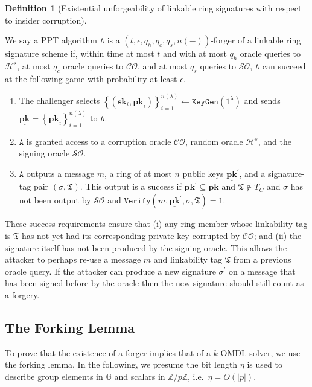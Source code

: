 \documentclass{article}
\theoremstyle{plain}
\theoremstyle{definition}
\newtheorem{defn}{Definition}[section]
\begin{document}
\begin{defn}[Existential unforgeability of linkable ring signatures with respect to insider corruption]\label{def:unf}

We say a PPT algorithm $\texttt{A}$  is a $(t, \epsilon, q_h, q_c, q_s,  n(-))$-forger of a linkable ring signature scheme if, within time at most $t$ and with at most $q_h$ oracle queries to $\mathcal{H}^s$, at most $q_c$ oracle queries to $\mathcal{CO}$, and at most $q_s$ queries to $\mathcal{SO}$, $\texttt{A}$ can succeed at the following game with probability at least $\epsilon$.
\begin{enumerate}
\item The challenger selects $\left\{(\textbf{sk}_i, \textbf{pk}_i)\right\}_{i=1}^{n(\lambda)} \leftarrow \texttt{KeyGen}(1^\lambda)$ and sends $\underline{\textbf{pk}} = \left\{\textbf{pk}_i\right\}_{i=1}^{n(\lambda)}$ to $\texttt{A}$. 

\item $\texttt{A}$ is granted access to a corruption oracle $\mathcal{CO}$, random oracle $\mathcal{H}^s$, and the signing oracle $\mathcal{SO}$.

\item $\texttt{A}$ outputs a message $m$, a ring of at most $n$ public keys $\underline{\textbf{pk}}^\prime$, and a signature-tag pair $(\sigma, \mathfrak{T})$. This output is a success if $\underline{\textbf{pk}}^\prime \subseteq \underline{\textbf{pk}}$ and $\mathfrak{T} \notin T_C$ and $\sigma$ has not been output by $\mathcal{SO}$ and $\texttt{Verify}(m, \underline{\textbf{pk}}^\prime, \sigma, \mathfrak{T}) = 1$.

\end{enumerate}
\end{defn}

These success requirements ensure that (i) any ring member whose linkability tag is $\mathfrak{T}$ has not yet had its corresponding private key corrupted by $\mathcal{CO}$; and (ii) the signature itself has not been produced by the signing oracle. This allows the attacker to perhaps re-use a message $m$ and linkability tag $\mathfrak{T}$ from a previous oracle query. If the attacker can produce a new signature $\sigma^\prime$ on a message that has been signed before by the oracle then the new signature should still count as a forgery.


\subsection{The Forking Lemma} To prove that the existence of a forger implies that of a $k$-OMDL solver, we use the forking lemma. In the following, we presume the bit length $\eta$ is used to describe group elements in $\mathbb{G}$ and scalars in $\mathbb{Z}/p\mathbb{Z}$, i.e.\ $\eta = O(\left|p\right|)$.
\end{document}
